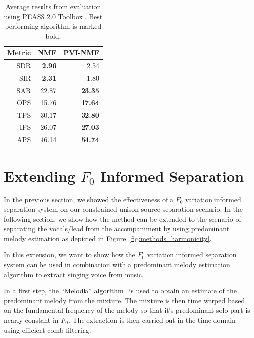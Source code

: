 \begin{table}
\begin{center}
\small
\begin{tabular}{ r | r r }
  Metric & NMF & PVI-NMF \\
  \hline
  SDR & \textbf{2.96} & 2.54 \\
  SIR & \textbf{2.31} & 1.80 \\
  SAR & 22.87 & \textbf{23.35} \\
  \hline
  OPS & 15.76 & \textbf{17.64}\\
  TPS & 30.17 & \textbf{32.80}\\
  IPS & 26.07 & \textbf{27.03}\\
  APS & 46.14 & \textbf{54.74}\\
\end{tabular}
\end{center}
  \caption{Average results from evaluation using PEASS 2.0 Toolbox \cite{emiya11}. Best performing algorithm is marked bold.}
  \label{tab:results}
\end{table}

\section{Extending $F_0$ Informed Separation}%
\label{sec:extendingf0}

In the previous section, we showed the effectiveness of a \(F_0\) variation informed separation system on our constrained unison source separation scenario.
In the following section, we show how the method can be extended to the scenario of separating the vocals/lead from the accompaniment by using predominant melody estimation as depicted in Figure~\ref{fig:methods_harmonicity}.

In this extension, we want to show how the \(F_0\) variation informed separation system can be used in combination with a predominant melody estimation algorithm to extract singing voice from music.

\par
In a first step, the ``Melodia'' algorithm~\cite{salamon12} is used to obtain an estimate of the predominant melody from the mixture.
The mixture is then time warped based on the fundamental frequency of the melody so that it’s predominant solo part is nearly constant in \(F_0\). The extraction is then carried out in the time domain using efficient comb filtering.


